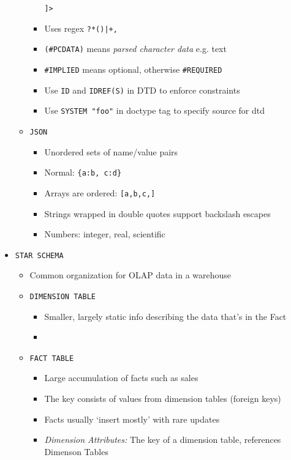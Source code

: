 \documentclass[landscape,8pt]{extarticle}
\newcommand{\code}{\lstinline}
\begin{document}
\begin{multicols}{4}
\begin{itemize}
\begin{itemize}
\begin{itemize}
\code{]>}
            \item Uses regex \code{?*()|+,}
            \item \code{(#PCDATA)} means \emph{parsed character data} e.g. text
            \item \code{#IMPLIED} means optional, otherwise \code{#REQUIRED}
            \item Use \code{ID} and \code{IDREF(S)} in DTD to enforce constraints
            \item Use \code{SYSTEM "foo"} in doctype tag to specify source for dtd
        \end{itemize}
        \item \code{JSON}
        \begin{itemize}
            \item Unordered sets of name/value pairs
            \item Normal: \lstinline|{a:b, c:d}|
            \item Arrays are ordered: \code{[a,b,c,]}
            \item Strings wrapped in double quotes support backslash escapes
            \item Numbers: integer, real, scientific
        \end{itemize}
    \end{itemize}
    \item \code{STAR SCHEMA}
    \begin{itemize}
        \item Common organization for OLAP data in a warehouse
        \item \code{DIMENSION TABLE}
        \begin{itemize}
            \item Smaller, largely static info describing the data that's in the Fact
            \item 
        \end{itemize}
        \item \code{FACT TABLE}
        \begin{itemize}
            \item Large accumulation of facts such as sales
            \item The key consists of values from dimension tables (foreign keys)
            \item Facts usually `insert mostly' with rare updates
            \item \emph{Dimension Attributes:} The key of a dimension table, references Dimenson Tables

\end{itemize}
\end{itemize}
\end{itemize}
\end{multicols}
\end{document}
